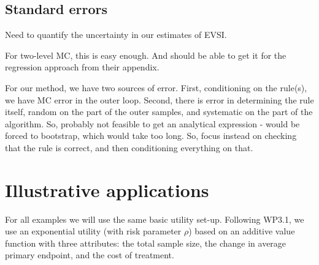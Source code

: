 \documentclass[sagev, Crown]{sagej} %
\begin{document}

\subsection{Standard errors}

Need to quantify the uncertainty in our estimates of EVSI. 

For two-level MC, this is easy enough. And should be able to get it for the regression approach from their appendix.

For our method, we have two sources of error. First, conditioning on the rule(s), we have MC error in the outer loop. Second, there is error in determining the rule itself, random on the part of the outer samples, and systematic on the part of the algorithm. So, probably not feasible to get an analytical expression - would be forced to bootstrap, which would take too long. So, focus instead on checking that the rule is correct, and then conditioning everything on that. 

\section{Illustrative applications}

For all examples we will use the same basic utility set-up. Following WP3.1, we use an exponential utility (with risk parameter $\rho$) based on an additive value function with three attributes: the total sample size, the change in average primary endpoint, and the cost of treatment.
\end{document}
